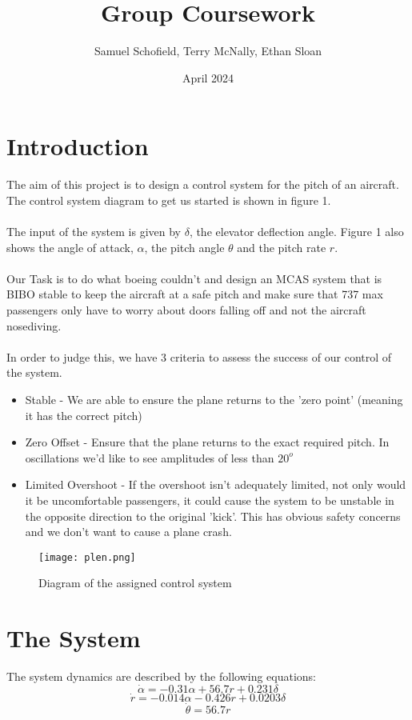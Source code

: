 \documentclass{article}
\title{Group Coursework}
\author{Samuel Schofield, Terry McNally, Ethan Sloan}
\date{April 2024}
\numberwithin{equation}{section}
\begin{document}
\maketitle

\section{Introduction}
The aim of this project is to design a control system for the pitch of an aircraft. The control system diagram to get us started is shown in figure 1.\\\\
The input of the system is given by \(\delta\), the elevator deflection angle. Figure 1 also shows the angle of attack, \(\alpha\), the pitch angle \(\theta\) and the pitch rate \(r\).\\\\
Our Task is to do what boeing couldn't and design an MCAS system that is BIBO stable to keep the aircraft at a safe pitch and make sure that 737 max passengers only have to worry about doors falling off and not the aircraft nosediving.\\\\
In order to judge this, we have 3 criteria to assess the success of our control of the system.
\begin{itemize}
    \item Stable - We are able to ensure the plane returns to the 'zero point' (meaning it has the correct pitch)
    \item Zero Offset - Ensure that the plane returns to the exact required pitch. In oscillations we'd like to see amplitudes of less than \(20^o\)
    \item Limited Overshoot - If the overshoot isn't adequately limited, not only would it be uncomfortable passengers, it could cause the system to be unstable in the opposite direction to the original 'kick'. This has obvious safety concerns and we don't want to cause a plane crash.
\end{itemize}



\begin{figure}
    \centering
    \texttt{[image: plen.png]}
    \caption{Diagram of the assigned control system}
    \label{fig:Figure 1}
\end{figure}
\newpage
\section{The System}
The system dynamics are described by the following equations:
\[\dot{\alpha}=-0.31\alpha + 56.7r + 0.231\delta\]
\[\dot{r}=-0.014\alpha - 0.426r +0.0203\delta\]
\[\dot{\theta} = 56.7r\]\\
\end{document}
